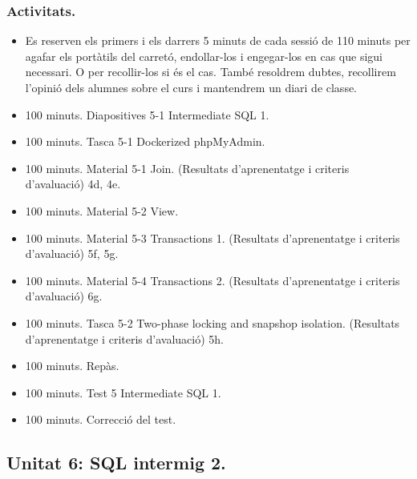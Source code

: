 \documentclass[catalan, a4paper, 12pt, titlepage]{article}
\begin{document}
  \subsubsection{Activitats.}

  \begin{itemize}
          \item Es reserven els primers i els darrers 5 minuts de cada sessió de 110 minuts per agafar els portàtils del carretó, endollar-los i engegar-los en cas que sigui necessari. O per recollir-los si és el cas. També resoldrem dubtes, recollirem l'opinió dels alumnes sobre el curs i mantendrem un diari de classe.
	  \item 100 minuts. Diapositives 5-1 Intermediate SQL 1.
	  \item 100 minuts. Tasca 5-1 Dockerized phpMyAdmin.
	  \item 100 minuts. Material 5-1 Join. (\faGraduationCap Resultats d'aprenentatge i criteris d'avaluació) 4d, 4e.
	  \item 100 minuts. Material 5-2 View.
	  \item 100 minuts. Material 5-3 Transactions 1. (\faGraduationCap Resultats d'aprenentatge i criteris d'avaluació) 5f, 5g.
	  \item 100 minuts. Material 5-4 Transactions 2. (\faGraduationCap Resultats d'aprenentatge i criteris d'avaluació) 6g.
	  \item 100 minuts. Tasca 5-2 Two-phase locking and snapshop isolation. (\faGraduationCap Resultats d'aprenentatge i criteris d'avaluació) 5h.
	  \item 100 minuts. Repàs.
	  \item 100 minuts. Test 5 Intermediate SQL 1.
	  \item 100 minuts. Correcció del test.
  \end{itemize}

  \subsection{Unitat 6: SQL intermig 2.}
\end{document}

